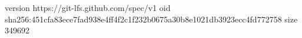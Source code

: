 version https://git-lfs.github.com/spec/v1
oid sha256:451cfa83ece7fad938e4ff4f2c1f232b0675a30b8e1021db3923ecc4fd772758
size 349692
